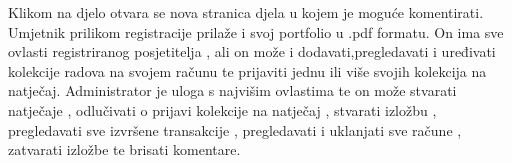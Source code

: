 {			Klikom na djelo otvara se nova stranica djela u kojem je moguće komentirati. 
			Umjetnik prilikom registracije prilaže i svoj portfolio u .pdf formatu. On ima sve ovlasti registriranog posjetitelja , ali on može i dodavati,pregledavati i uređivati kolekcije radova na 				svojem računu te prijaviti jednu ili više svojih kolekcija na natječaj.
			Administrator je uloga s najvišim ovlastima te on može stvarati natječaje , odlučivati o prijavi kolekcije na natječaj , stvarati izložbu , pregledavati sve izvršene transakcije , 					pregledavati i uklanjati sve račune , zatvarati izložbe te brisati komentare.
}
		
		
